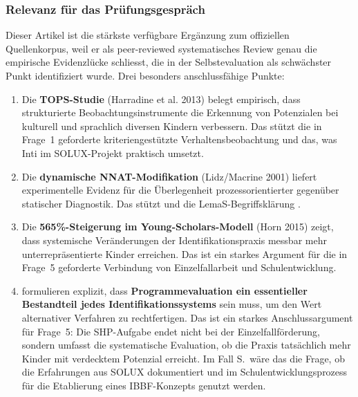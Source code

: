 \documentclass[ngerman, a4paper]{article}
\begin{document}
\subsubsection*{Relevanz für das Prüfungsgespräch}

Dieser Artikel ist die stärkste verfügbare Ergänzung zum offiziellen
Quellenkorpus, weil er als peer-reviewed systematisches Review genau die
empirische Evidenzlücke schliesst, die in der Selbstevaluation als
schwächster Punkt identifiziert wurde. Drei besonders anschlussfähige
Punkte:

\begin{enumerate}
  \item Die \textbf{TOPS-Studie} (Harradine et al. 2013) belegt
        empirisch, dass strukturierte Beobachtungsinstrumente die Erkennung
        von Potenzialen bei kulturell und sprachlich diversen Kindern
        verbessern. Das stützt die in Frage~1 geforderte kriteriengestützte
        Verhaltensbeobachtung und das, was Inti im SOLUX-Projekt praktisch
        umsetzt.
  \item Die \textbf{dynamische NNAT-Modifikation} (Lidz/Macrine 2001)
        liefert experimentelle Evidenz für die Überlegenheit
        prozessorientierter gegenüber statischer Diagnostik. Das stützt
        \textcite[S.\,274--303]{preckel2021tad} und die LemaS-Begriffsklärung
        \parencite{lemas2023begriffsklaerung}.
  \item Die \textbf{565\%-Steigerung im Young-Scholars-Modell} (Horn
        2015) zeigt, dass systemische Veränderungen der
        Identifikationspraxis messbar mehr unterrepräsentierte Kinder
        erreichen. Das ist ein starkes Argument für die in Frage~5
        geforderte Verbindung von Einzelfallarbeit und Schulentwicklung.
  \item \textcite[S.\,325]{mun2020identifying}
        formulieren explizit, dass \textbf{Programmevaluation
          ein essentieller Bestandteil jedes Identifikationssystems} sein muss,
        um den Wert alternativer Verfahren zu rechtfertigen. Das ist ein
        starkes Anschlussargument für Frage~5: Die SHP-Aufgabe endet nicht bei
        der Einzelfallförderung, sondern umfasst die systematische Evaluation,
        ob die Praxis tatsächlich mehr Kinder mit verdecktem Potenzial
        erreicht. Im Fall S.\ wäre das die Frage, ob die Erfahrungen aus SOLUX
        dokumentiert und im Schulentwicklungsprozess für die Etablierung eines
        IBBF-Konzepts genutzt werden.
\end{enumerate}
\end{document}
